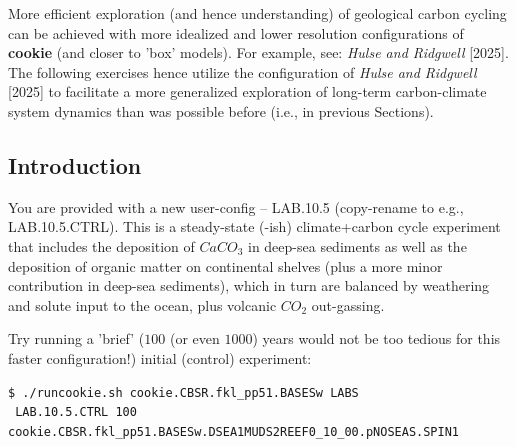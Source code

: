 More efficient exploration (and hence understanding) of geological carbon cycling can be achieved with more idealized and lower resolution configurations of \textbf{cookie} (and closer to 'box' models). For example, see: \textit{Hulse and Ridgwell} [2025]. The following exercises hence utilize the configuration of \textit{Hulse and Ridgwell} [2025] to facilitate a more generalized exploration of long-term carbon-climate system dynamics than was possible before (i.e., in previous Sections).


\subsection{Introduction}

You are provided with a new user-config -- \textsf{\footnotesize LAB.10.5} (copy-rename to e.g., \textsf{\footnotesize LAB.10.5.CTRL}). This is a steady-state (-ish) climate+carbon cycle experiment that includes the deposition of \(CaCO_{3}\) in deep-sea sediments as well as the deposition of organic matter on continental shelves (plus a more minor contribution in deep-sea sediments), which in turn are balanced by weathering and solute input to the ocean, plus volcanic \(CO_{2}\) out-gassing. 

Try running a 'brief' ($100$ (or even $1000$) years would not be too tedious for this faster configuration!) initial (control) experiment:

\vspace{-2mm}\small\begin{verbatim}
$ ./runcookie.sh cookie.CBSR.fkl_pp51.BASESw LABS 
 LAB.10.5.CTRL 100 cookie.CBSR.fkl_pp51.BASESw.DSEA1MUDS2REEF0_10_00.pNOSEAS.SPIN1
\end{verbatim}\normalsize\vspace{-2mm}

